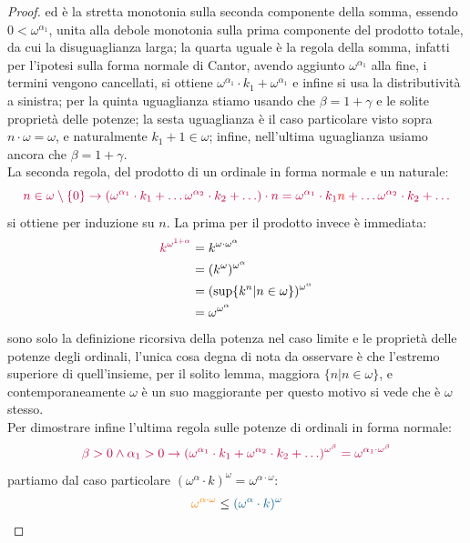 \begin{proof}
	ed \`e la stretta monotonia sulla seconda componente della somma, essendo $0 < \omega^{\alpha_1}$, unita alla debole monotonia sulla prima componente del prodotto totale, da cui la disuguaglianza larga; la quarta uguale \`e la regola della somma, infatti per l'ipotesi sulla forma normale di Cantor,
	avendo aggiunto $\omega^{\alpha_1}$ alla fine, i termini vengono cancellati, si ottiene $\omega^{\alpha_1} \cdot k_1 + \omega^{\alpha_1}$ e infine si usa la distributivit\`a a sinistra;
	per la quinta uguaglianza stiamo usando che $\beta = 1 + \gamma$ e le solite propriet\`a delle potenze; la sesta uguaglianza \`e il caso particolare visto sopra $n \cdot \omega = \omega$, e naturalmente $k_1 + 1 \in \omega$; infine, nell'ultima uguaglianza usiamo ancora che $\beta = 1 + \gamma$.\\
	La seconda regola, del prodotto di un ordinale in forma normale e un naturale:
	\[ \textcolor{purple}{n \in \omega\setminus\{0\} \rightarrow (\omega^{\alpha_1} \cdot k_1 + \ldots \omega^{\alpha_2} \cdot k_2 + \ldots) \cdot n = \omega^{\alpha_1} \cdot k_1\textcolor{red}{n} + \ldots \omega^{\alpha_2} \cdot k_2 + \ldots}
		\]
	si ottiene per induzione su $n$. La prima per il prodotto invece \`e immediata:
	\[ \begin{split}
		\textcolor{purple}{k^{\omega^{1+\alpha}}} &= k^{\omega \cdot \omega^{\alpha}} \\
												  &= (k^{\omega})^{\omega^{\alpha}} \\
												  &= (\sup\{k^{n} | n \in \omega\})^{\omega^{\alpha}} \\
												  &= \omega^{\omega^{\alpha}}
		\end{split}
		\]
	sono solo la definizione ricorsiva della potenza nel caso limite e le propriet\`a delle potenze degli ordinali, l'unica cosa degna di nota da osservare \`e che l'estremo superiore di quell'insieme,
	per il solito lemma, maggiora $\{n | n \in \omega\}$, e contemporaneamente $\omega$ \`e un suo maggiorante per questo motivo si vede che \`e $\omega$ stesso.\\
	Per dimostrare infine l'ultima regola sulle potenze di ordinali in forma normale:
	\[ \textcolor{purple}{\beta > 0 \land \alpha_1 > 0 \rightarrow (\omega^{\alpha_1} \cdot k_1 + \omega^{\alpha_2} \cdot k_2 + \ldots)^{\omega^\beta} = \omega^{\alpha_1 \cdot \omega^{\beta}}}
		\]
	partiamo dal caso particolare $(\omega^{\alpha} \cdot k)^{\omega} = \omega^{\alpha \cdot \omega}$:
	\[ \begin{split}
		\textcolor{orange}{\omega^{\alpha \cdot \omega}} &\leq \textcolor{MidnightBlue}{(\omega^{\alpha} \cdot k)^{\omega}} \\

\end{split}\]
\end{proof}
